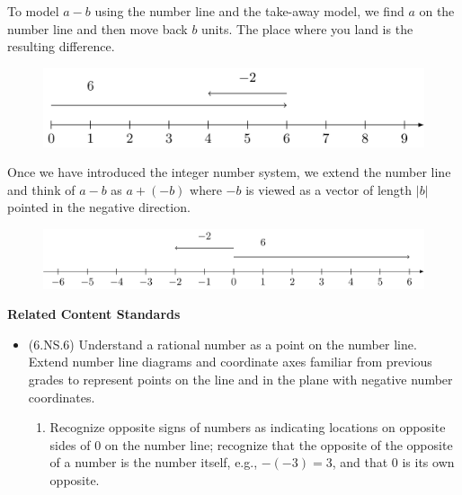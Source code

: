 \documentclass[
]{book}
\providecommand{\tightlist}{%
  \setlength{\itemsep}{0pt}\setlength{\parskip}{0pt}}
\newenvironment{standards}{}{}
\theoremstyle{definition}
\theoremstyle{definition}
\theoremstyle{definition}
\theoremstyle{definition}
\theoremstyle{remark}
\begin{document}
To model \(a-b\) using the number line and the take-away model, we find \(a\) on the number line and then move back \(b\) units. The place where you land is the resulting difference.

\begin{figure}

{\centering \includegraphics[width=0.7\linewidth]{tikz/subtraction-model-numberline} 

}

\end{figure}

Once we have introduced the integer number system, we extend the number line and think of \(a-b\) as \(a+(-b)\) where \(-b\) is viewed as a vector of length \(|b|\) pointed in the negative direction.

\begin{figure}

{\centering \includegraphics[width=0.8\linewidth]{tikz/subtraction-model-numberline2} 

}

\end{figure}

\begin{standards}

\begin{center}
\textbf{Related Content Standards}

\end{center}

\begin{itemize}
\tightlist
\item
  (6.NS.6) Understand a rational number as a point on the number line. Extend number line diagrams and coordinate axes familiar from previous grades to represent points on the line and in the plane with negative number coordinates.

  \begin{enumerate}
  \def\labelenumi{\alph{enumi}.}
  \tightlist
  \item
    Recognize opposite signs of numbers as indicating locations on opposite sides of \(0\) on the number line; recognize that the opposite of the opposite of a number is the number itself, e.g., \(-(-3) = 3\), and that \(0\) is its own opposite.
  \end{enumerate}
\end{itemize}

\end{standards}
\end{document}
